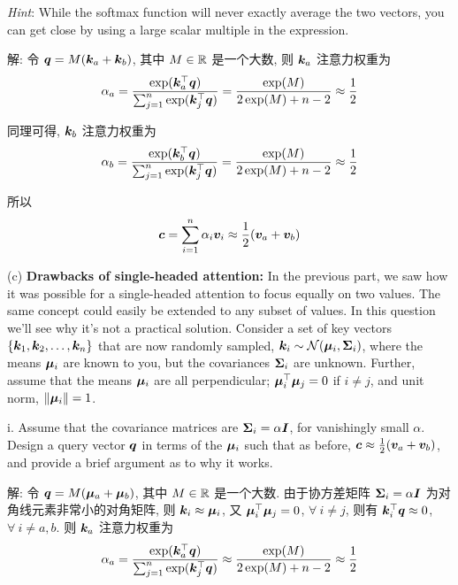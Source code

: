 \documentclass{article}
\begin{document}
\emph{Hint}: While the softmax function will never exactly average the two vectors, you can get close by using a large scalar multiple
in the expression.

解: 令 $\bm{q}=M(\bm{k}_a+\bm{k}_b)$, 其中 $M\in\mathbb{R}$ 是一个大数, 则 $\bm{k}_a$ 注意力权重为
\begin{equation}
  \alpha_a
  =\frac{\exp(\bm{k}_{a}^{\top}\bm{q})}{\sum_{j=1}^{n}\exp(\bm{k}_{j}^{\top}\bm{q})}
  =\frac{\exp(M)}{2\exp(M)+n-2}
  \approx\frac{1}{2}
\end{equation}

同理可得, $\bm{k}_b$ 注意力权重为
\begin{equation}
  \alpha_b
  =\frac{\exp(\bm{k}_{b}^{\top}\bm{q})}{\sum_{j=1}^{n}\exp(\bm{k}_{j}^{\top}\bm{q})}
  =\frac{\exp(M)}{2\exp(M)+n-2}
  \approx\frac{1}{2}
\end{equation}

所以
\begin{equation}
  \bm{c}
  =\sum_{i=1}^{n}\alpha_{i}\bm{v}_{i}
  \approx\frac{1}{2}(\bm{v}_{a}+\bm{v}_{b})
\end{equation}

(c) \textbf{Drawbacks of single-headed attention:} In the previous part, we saw how it was possible for a single-headed attention to focus equally on two values. The same concept could easily be extended to any subset of values. In this question we'll see why it's not a practical solution. Consider a set of key vectors $\{\bm{k}_{1},\bm{k}_2,\dots, \bm{k}_{n}\}$ that are now randomly sampled, $\bm{k}_{i}\sim\mathcal{N}(\bm{\mu}_{i}, \bm{\Sigma}_{i}) $, where the means $\bm{\mu}_{i}$ are known to you, but the covariances $\bm{\Sigma}_{i}$ are unknown. Further, assume that the means $\bm{\mu}_i$ are all perpendicular; $\bm{\mu}_{i}^{\top}\bm{\mu}_{j}=0$ if $i \neq j$, and unit norm, $\|\bm{\mu}_{i}\|=1$.

\quad i. Assume that the covariance matrices are $\bm{\Sigma}_{i}=\alpha \bm{I}$, for vanishingly small $\alpha$. Design a query vector $\bm{q}$ in terms of the $\bm{\mu}_i$ such that as before, $\bm{c} \approx\frac{1}{2}(\bm{v}_{a}+\bm{v}_{b})$, and provide a brief argument as to why it works.

解: 令 $\bm{q}=M(\bm{\mu}_a+\bm{\mu}_b)$, 其中 $M\in\mathbb{R}$ 是一个大数. 由于协方差矩阵 $\bm{\Sigma}_{i}=\alpha \bm{I}$ 为对角线元素非常小的对角矩阵, 则 $\bm{k}_i\approx\bm{\mu}_i$, 又 $\bm{\mu}_{i}^{\top}\bm{\mu}_{j}=0$, $\forall~i\neq j$, 则有 $\bm{k}_i^\top\bm{q}\approx0$, $\forall~i\neq a,b$. 则 $\bm{k}_a$ 注意力权重为
\begin{equation}
  \alpha_a
  =\frac{\exp(\bm{k}_{a}^{\top}\bm{q})}{\sum_{j=1}^{n}\exp(\bm{k}_{j}^{\top}\bm{q})}
  \approx\frac{\exp(M)}{2\exp(M)+n-2}
  \approx\frac{1}{2}
\end{equation}
\end{document}
